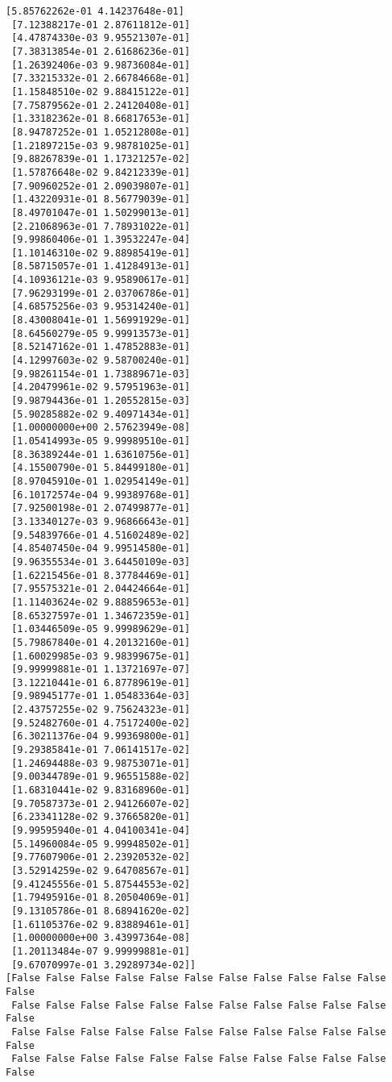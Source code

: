 \documentclass[11pt]{article}
\begin{document}
\begin{Verbatim}[commandchars=\\\{\}]
 [5.85762262e-01 4.14237648e-01]
 [7.12388217e-01 2.87611812e-01]
 [4.47874330e-03 9.95521307e-01]
 [7.38313854e-01 2.61686236e-01]
 [1.26392406e-03 9.98736084e-01]
 [7.33215332e-01 2.66784668e-01]
 [1.15848510e-02 9.88415122e-01]
 [7.75879562e-01 2.24120408e-01]
 [1.33182362e-01 8.66817653e-01]
 [8.94787252e-01 1.05212808e-01]
 [1.21897215e-03 9.98781025e-01]
 [9.88267839e-01 1.17321257e-02]
 [1.57876648e-02 9.84212339e-01]
 [7.90960252e-01 2.09039807e-01]
 [1.43220931e-01 8.56779039e-01]
 [8.49701047e-01 1.50299013e-01]
 [2.21068963e-01 7.78931022e-01]
 [9.99860406e-01 1.39532247e-04]
 [1.10146310e-02 9.88985419e-01]
 [8.58715057e-01 1.41284913e-01]
 [4.10936121e-03 9.95890617e-01]
 [7.96293199e-01 2.03706786e-01]
 [4.68575256e-03 9.95314240e-01]
 [8.43008041e-01 1.56991929e-01]
 [8.64560279e-05 9.99913573e-01]
 [8.52147162e-01 1.47852883e-01]
 [4.12997603e-02 9.58700240e-01]
 [9.98261154e-01 1.73889671e-03]
 [4.20479961e-02 9.57951963e-01]
 [9.98794436e-01 1.20552815e-03]
 [5.90285882e-02 9.40971434e-01]
 [1.00000000e+00 2.57623949e-08]
 [1.05414993e-05 9.99989510e-01]
 [8.36389244e-01 1.63610756e-01]
 [4.15500790e-01 5.84499180e-01]
 [8.97045910e-01 1.02954149e-01]
 [6.10172574e-04 9.99389768e-01]
 [7.92500198e-01 2.07499877e-01]
 [3.13340127e-03 9.96866643e-01]
 [9.54839766e-01 4.51602489e-02]
 [4.85407450e-04 9.99514580e-01]
 [9.96355534e-01 3.64450109e-03]
 [1.62215456e-01 8.37784469e-01]
 [7.95575321e-01 2.04424664e-01]
 [1.11403624e-02 9.88859653e-01]
 [8.65327597e-01 1.34672359e-01]
 [1.03446509e-05 9.99989629e-01]
 [5.79867840e-01 4.20132160e-01]
 [1.60029985e-03 9.98399675e-01]
 [9.99999881e-01 1.13721697e-07]
 [3.12210441e-01 6.87789619e-01]
 [9.98945177e-01 1.05483364e-03]
 [2.43757255e-02 9.75624323e-01]
 [9.52482760e-01 4.75172400e-02]
 [6.30211376e-04 9.99369800e-01]
 [9.29385841e-01 7.06141517e-02]
 [1.24694488e-03 9.98753071e-01]
 [9.00344789e-01 9.96551588e-02]
 [1.68310441e-02 9.83168960e-01]
 [9.70587373e-01 2.94126607e-02]
 [6.23341128e-02 9.37665820e-01]
 [9.99595940e-01 4.04100341e-04]
 [5.14960084e-05 9.99948502e-01]
 [9.77607906e-01 2.23920532e-02]
 [3.52914259e-02 9.64708567e-01]
 [9.41245556e-01 5.87544553e-02]
 [1.79495916e-01 8.20504069e-01]
 [9.13105786e-01 8.68941620e-02]
 [1.61105376e-02 9.83889461e-01]
 [1.00000000e+00 3.43997364e-08]
 [1.20113484e-07 9.99999881e-01]
 [9.67070997e-01 3.29289734e-02]]
[False False False False False False False False False False False False
 False False False False False False False False False False False False
 False False False False False False False False False False False False
 False False False False False False False False False False False False

\end{Verbatim}
\end{document}
